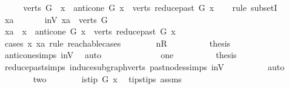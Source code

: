 \begin{isabellebody}
\ \isanewline
\ \ \isamarkupfalse%
\ {\isachardoublequoteopen}verts\ G\ {\isasymsubseteq}\ {\isacharbraceleft}{\kern0pt}x{\isacharbraceright}{\kern0pt}\ {\isasymunion}\ anticone\ G\ x\ {\isasymunion}\ verts\ {\isacharparenleft}{\kern0pt}reduce{\isacharunderscore}{\kern0pt}past\ G\ x{\isacharparenright}{\kern0pt}{\isachardoublequoteclose}\ \isanewline
\ \ \isamarkupfalse%
{\isacharparenleft}{\kern0pt}rule\ subsetI{\isacharparenright}{\kern0pt}\isanewline
\ \ \ \ \isamarkupfalse%
\ xa\ \isanewline
\ \ \ \ \isamarkupfalse%
\ in{\isacharunderscore}{\kern0pt}V{\isacharcolon}{\kern0pt}\ {\isachardoublequoteopen}xa\ {\isasymin}\ verts\ G{\isachardoublequoteclose}\isanewline
\ \ \ \ \isamarkupfalse%
\ \isamarkupfalse%
\ {\isachardoublequoteopen}xa\ {\isasymin}\ {\isacharbraceleft}{\kern0pt}x{\isacharbraceright}{\kern0pt}\ {\isasymunion}\ anticone\ G\ x\ {\isasymunion}\ verts\ {\isacharparenleft}{\kern0pt}reduce{\isacharunderscore}{\kern0pt}past\ G\ x{\isacharparenright}{\kern0pt}{\isachardoublequoteclose}\isanewline
\ \ \ \ \isamarkupfalse%
{\isacharparenleft}{\kern0pt}\ cases\ x\ xa\ rule{\isacharcolon}{\kern0pt}\ reachable{}{\isacharunderscore}{\kern0pt}cases{\isacharparenright}{\kern0pt}\isanewline
\ \ \ \ \ \ \isamarkupfalse%
\ nR\isanewline
\ \ \ \ \ \ \isamarkupfalse%
\ \isamarkupfalse%
\ {\isacharquery}{\kern0pt}thesis\ \isamarkupfalse%
\ anticone{\isachardot}{\kern0pt}simps\ in{\isacharunderscore}{\kern0pt}V\ \isamarkupfalse%
\ auto\ \isanewline
\ \ \ \ \isamarkupfalse%
\isanewline
\ \ \ \ \ \ \isamarkupfalse%
\ one\isanewline
\ \ \ \ \ \ \isamarkupfalse%
\ \isamarkupfalse%
\ {\isacharquery}{\kern0pt}thesis\ \isamarkupfalse%
\ reduce{\isacharunderscore}{\kern0pt}past{\isachardot}{\kern0pt}simps\ induce{\isacharunderscore}{\kern0pt}subgraph{\isacharunderscore}{\kern0pt}verts\ past{\isacharunderscore}{\kern0pt}nodes{\isachardot}{\kern0pt}simps\ in{\isacharunderscore}{\kern0pt}V\isanewline
\ \ \ \ \ \ \ \ \isamarkupfalse%
\ auto\isanewline
\ \ \ \ \isamarkupfalse%
\isanewline
\ \ \ \ \ \ \isamarkupfalse%
\ two\isanewline
\ \ \ \ \ \ \isamarkupfalse%
\ {\isachardoublequoteopen}is{\isacharunderscore}{\kern0pt}tip\ G\ x{\isachardoublequoteclose}\ \isamarkupfalse%
\ tips{\isacharunderscore}{\kern0pt}tips\ assms{\isacharparenleft}{\kern0pt}{}{\isacharparenright}{\kern0pt}\ \isamarkupfalse%

\end{isabellebody}

